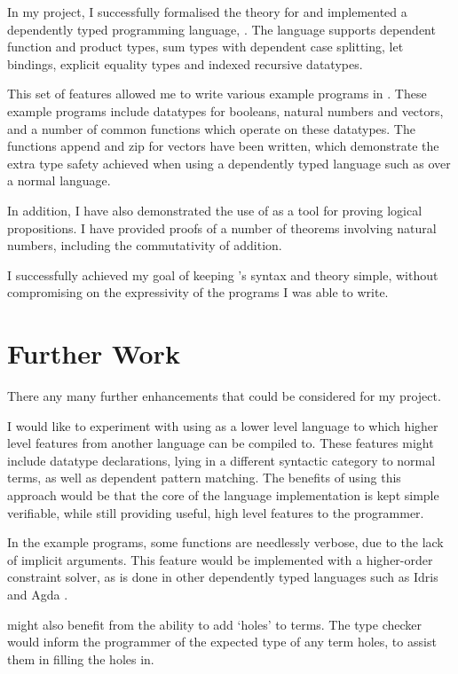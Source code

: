 \documentclass[12pt,a4paper,twoside]{report}
\begin{document}
In my project, I successfully formalised the theory for and implemented a dependently typed programming language, \pimu{}.
The language supports dependent function and product types, sum types with dependent case splitting, let bindings, explicit equality types and indexed recursive datatypes.

This set of features allowed me to write various example programs in \pimu{}.
These example programs include datatypes for booleans, natural numbers and vectors, and a number of common functions which operate on these datatypes.
The functions append and zip for vectors have been written, which demonstrate the extra type safety achieved when using a dependently typed language such as \pimu{} over a normal language.

In addition, I have also demonstrated the use of \pimu{} as a tool for proving logical propositions.
I have provided proofs of a number of theorems involving natural numbers, including the commutativity of addition.

I successfully achieved my goal of keeping \pimu{}'s syntax and theory simple, without compromising on the expressivity of the programs I was able to write.

\section{Further Work}

There any many further enhancements that could be considered for my project.

I would like to experiment with using \pimu{} as a lower level language to which higher level features from another language can be compiled to.
These features might include datatype declarations, lying in a different syntactic category to normal terms, as well as dependent pattern matching.
The benefits of using this approach would be that the core of the language implementation is kept simple verifiable, while still providing useful, high level features to the programmer.

In the example programs, some functions are needlessly verbose, due to the lack of implicit arguments.
This feature would be implemented with a higher-order constraint solver, as is done in other dependently typed languages such as Idris \cite{brady13} and Agda \cite{norell07}.

\pimu{} might also benefit from the ability to add `holes' to terms.
The type checker would inform the programmer of the expected type of any term holes, to assist them in filling the holes in.
\end{document}
